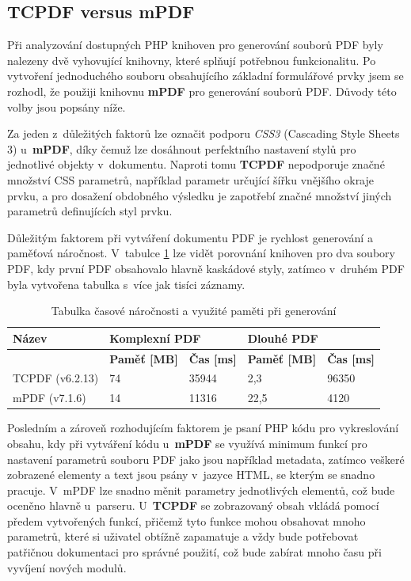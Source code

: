 \subsection{TCPDF versus mPDF}
Při analyzování dostupných PHP knihoven pro generování souborů PDF byly nalezeny dvě vyhovující knihovny, které splňují potřebnou funkcionalitu. Po vytvoření jednoduchého souboru obsahujícího základní formulářové prvky jsem se rozhodl, že použiji knihovnu \textbf{mPDF} pro generování souborů PDF. Důvody této volby jsou popsány níže.
\par
Za jeden z~důležitých faktorů lze označit podporu \textit{CSS3} (Cascading Style Sheets 3) u~\textbf{mPDF}, díky čemuž lze dosáhnout perfektního nastavení stylů pro jednotlivé objekty v~dokumentu. Naproti tomu \textbf{TCPDF} nepodporuje značné množství CSS parametrů, například parametr určující šířku vnějšího okraje prvku, a pro dosažení obdobného výsledku je zapotřebí značné množství jiných parametrů definujících styl prvku.
\par
Důležitým faktorem při vytváření dokumentu PDF je rychlost generování a paměťová náročnost. V~tabulce \ref{tab:table_generators} lze vidět porovnání knihoven pro dva  soubory PDF, kdy první PDF obsahovalo hlavně kaskádové styly, zatímco v~druhém PDF byla vytvořena tabulka s~více jak tisíci záznamy.
\begin{table}[h!]
\centering
\begin{tabular}{|l|l|l|l|l|} 
\hline
\textbf{Název} & \multicolumn{2}{l|}{\textbf{Komplexní PDF}} & \multicolumn{2}{l|}{\textbf{Dlouhé PDF}}  \\ 
\hline
               & \textbf{Paměť [MB]} & \textbf{Čas [ms]}     & \textbf{Paměť [MB]} & \textbf{Čas [ms]}   \\ 
\hline
TCPDF (v6.2.13)          & 74                  & 35944                 & 2,3                 & 96350               \\ 
\hline
mPDF   (v7.1.6)           & 14                  & 11316                 & 22,5                & 4120                \\
\hline
\end{tabular}
\caption{Tabulka časové náročnosti a využité paměti při generování}
\label{tab:table_generators}
\end{table}
\par
Posledním a zároveň rozhodujícím faktorem je psaní PHP kódu pro vykreslování obsahu, kdy při vytváření kódu u~\textbf{mPDF} se využívá minimum funkcí pro nastavení parametrů souboru PDF jako jsou například metadata, zatímco veškeré zobrazené elementy a text jsou psány v~jazyce HTML, se kterým se snadno pracuje. V~mPDF lze snadno měnit parametry jednotlivých elementů, což bude oceněno hlavně u~parseru. U~\textbf{TCPDF} se zobrazovaný obsah vkládá pomocí předem vytvořených funkcí, přičemž tyto funkce mohou obsahovat mnoho parametrů, které si uživatel obtížně zapamatuje a vždy bude potřebovat patřičnou dokumentaci pro správné použití, což bude zabírat mnoho času při vyvíjení nových modulů.
